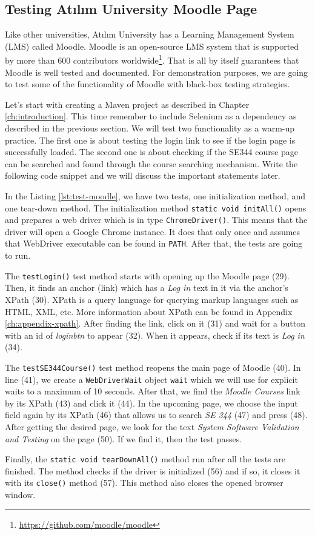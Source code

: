 \subsection{Testing Atılım University Moodle Page}
Like other universities, Atılım University has a Learning Management System (LMS) called Moodle. Moodle is an open-source LMS system that is supported by more than 600 contributors worldwide\footnote{\url{https://github.com/moodle/moodle}}. That is all by itself guarantees that Moodle is well tested and documented. For demonstration purposes, we are going to test some of the functionality of Moodle with black-box testing strategies.

Let's start with creating a Maven project as described in Chapter \ref{ch:introduction}. This time remember to include Selenium as a dependency as described in the previous section. We will test two functionality as a warm-up practice. The first one is about testing the login link to see if the login page is successfully loaded. The second one is about checking if the SE344 course page can be searched and found through the course searching mechanism. Write the following code snippet and we will discuss the important statements later.



In the Listing \ref{lst:test-moodle}, we have two tests, one initialization method, and one tear-down method. The initialization method \lstinline!static void initAll()! opens and prepares a web driver which is in type \lstinline!ChromeDriver()!. This means that the driver will open a Google Chrome instance. It does that only once and assumes that WebDriver executable can be found in \lstinline[language={}]!PATH!. After that, the tests are going to run.

The \lstinline!testLogin()! test method starts with opening up the Moodle page (29). Then, it finds an anchor (link) which has a \emph{Log in} text in it via the anchor's XPath (30). XPath is a query language for querying markup languages such as HTML, XML, etc. More information about XPath can be found in Appendix \ref{ch:appendix-xpath}. After finding the link, click on it (31) and wait for a button with an id of \emph{loginbtn} to appear (32). When it appears, check if its text is \emph{Log in} (34).

The \lstinline!testSE344Course()! test method reopens the main page of Moodle (40). In line (41), we create a \lstinline!WebDriverWait! object \lstinline!wait! which we will use for explicit waits to a maximum of 10 seconds. After that, we find the \emph{Moodle Courses} link by its XPath (43) and click it (44). In the upcoming page, we choose the input field again by its XPath (46) that allows us to search \emph{SE 344} (47) and press \keys{\return} (48). After getting the desired page, we look for the text \emph{System Software Validation and Testing} on the page (50). If we find it, then the test passes.

Finally, the \lstinline!static void tearDownAll()! method run after all the tests are finished. The method checks if the driver is initialized (56) and if so, it closes it with its \lstinline!close()! method (57). This method also closes the opened browser window.
